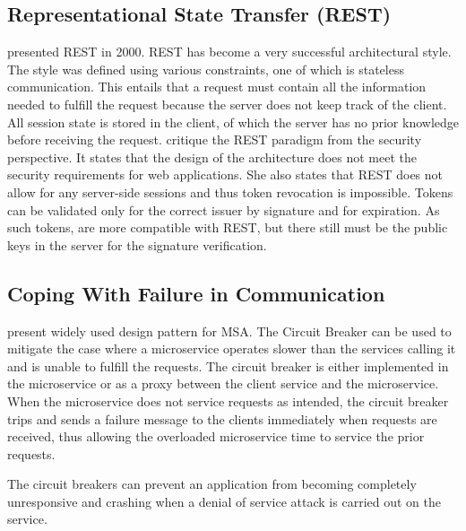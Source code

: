 \subsection{Representational State Transfer (REST)}
\begin{sloppypar}
    \citet{restroy} presented REST in 2000. REST has become a very successful
    architectural style. The style was defined using various constraints, one of
    which is stateless communication. This entails that a request must contain
    all the information needed to fulfill the request because the server does
    not keep track of the client. All session state is stored in the client, of
    which the server has no prior knowledge before receiving the request.
    \citet{secchalmsa} critique the REST paradigm from the security perspective.
    It states that the design of the architecture does not meet the security
    requirements for web applications. She also states that REST does not allow
    for any server-side sessions and thus token revocation is impossible. Tokens
    can be validated only for the correct issuer by signature and for
    expiration. As such tokens, are more compatible with REST, but there still
    must be the public keys in the server for the signature verification.
\end{sloppypar}

\subsection{Coping With Failure in Communication}
\begin{sloppypar}
    \citet{DBLP:journals/corr/MontesiW16} present widely used design pattern for
    MSA. The Circuit Breaker can be used to mitigate the case where a
    microservice operates slower than the services calling it and is unable to
    fulfill the requests. The circuit breaker is either implemented in the
    microservice or as a proxy between the client service and the microservice.
    When the microservice does not service requests as intended, the circuit
    breaker trips and sends a failure message to the clients immediately when
    requests are received, thus allowing the overloaded microservice time to
    service the prior requests.
\end{sloppypar}
\begin{sloppypar}
    The circuit breakers can prevent an application from becoming completely
    unresponsive and crashing when a denial of service attack is carried out on
    the service.
\end{sloppypar}

